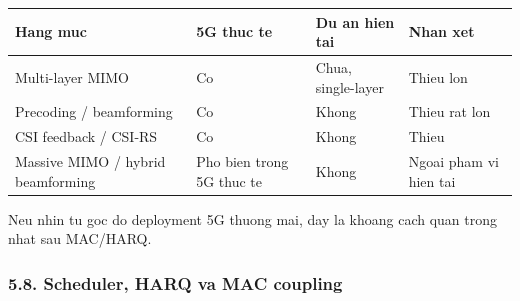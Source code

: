 \documentclass[
  vietnamese,
  a4paper,
  11pt]{article}
\newcounter{none} %
\begin{document}
{\def\LTcaptype{none} %
\begin{longtable}[]{@{}
  >{\raggedright\arraybackslash}p{}
  >{\raggedright\arraybackslash}p{}
  >{\raggedright\arraybackslash}p{}
  >{\raggedright\arraybackslash}p{}@{}}
\toprule\noalign{}
\begin{minipage}[b]{\linewidth}\raggedright
Hang muc
\end{minipage} & \begin{minipage}[b]{\linewidth}\raggedright
5G thuc te
\end{minipage} & \begin{minipage}[b]{\linewidth}\raggedright
Du an hien tai
\end{minipage} & \begin{minipage}[b]{\linewidth}\raggedright
Nhan xet
\end{minipage} \\
\midrule\noalign{}
\endhead
\bottomrule\noalign{}
\endlastfoot
Multi-layer MIMO & Co & Chua, single-layer & Thieu lon \\
Precoding / beamforming & Co & Khong & Thieu rat lon \\
CSI feedback / CSI-RS & Co & Khong & Thieu \\
Massive MIMO / hybrid beamforming & Pho bien trong 5G thuc te & Khong &
Ngoai pham vi hien tai \\
\end{longtable}
}

Neu nhin tu goc do deployment 5G thuong mai, day la khoang cach quan
trong nhat sau MAC/HARQ.

\subsubsection{5.8. Scheduler, HARQ va MAC
coupling}\label{scheduler-harq-va-mac-coupling}
\end{document}
